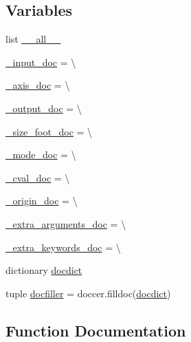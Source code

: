 \subsection*{Variables}
\begin{DoxyCompactItemize}
\item 
list \hyperlink{namespacescipy_1_1ndimage_1_1filters_ac79030aaeea1d53c8b972f784ac66d06}{\+\_\+\+\_\+all\+\_\+\+\_\+}
\item 
\hyperlink{namespacescipy_1_1ndimage_1_1filters_a08ef522f16742ebb067397136cab147e}{\+\_\+input\+\_\+doc} = \textbackslash{}
\item 
\hyperlink{namespacescipy_1_1ndimage_1_1filters_ae52acf6c02c107c138569883c504a41a}{\+\_\+axis\+\_\+doc} = \textbackslash{}
\item 
\hyperlink{namespacescipy_1_1ndimage_1_1filters_a69c29fe224c1e81495866bef44d9e62c}{\+\_\+output\+\_\+doc} = \textbackslash{}
\item 
\hyperlink{namespacescipy_1_1ndimage_1_1filters_adac799f87c552106379fd582c7191970}{\+\_\+size\+\_\+foot\+\_\+doc} = \textbackslash{}
\item 
\hyperlink{namespacescipy_1_1ndimage_1_1filters_a722135c1c890de3b40b1da0b938212a6}{\+\_\+mode\+\_\+doc} = \textbackslash{}
\item 
\hyperlink{namespacescipy_1_1ndimage_1_1filters_ac8ff6160df07471e0052d8b6415fe4d1}{\+\_\+cval\+\_\+doc} = \textbackslash{}
\item 
\hyperlink{namespacescipy_1_1ndimage_1_1filters_a8dba5fd5086b763fe538468c6235489f}{\+\_\+origin\+\_\+doc} = \textbackslash{}
\item 
\hyperlink{namespacescipy_1_1ndimage_1_1filters_ab4871ea2b9c43a04db7cdec46e38c919}{\+\_\+extra\+\_\+arguments\+\_\+doc} = \textbackslash{}
\item 
\hyperlink{namespacescipy_1_1ndimage_1_1filters_a894680df26ed62608b4205d3d7fd6f88}{\+\_\+extra\+\_\+keywords\+\_\+doc} = \textbackslash{}
\item 
dictionary \hyperlink{namespacescipy_1_1ndimage_1_1filters_a3ef4ac5181e80a02cfaad0bb6e786db3}{docdict}
\item 
tuple \hyperlink{namespacescipy_1_1ndimage_1_1filters_a5d480e01864ddd5886da30ab77494d2a}{docfiller} = doccer.\+filldoc(\hyperlink{namespacescipy_1_1ndimage_1_1filters_a3ef4ac5181e80a02cfaad0bb6e786db3}{docdict})
\end{DoxyCompactItemize}


\subsection{Function Documentation}
\hypertarget{namespacescipy_1_1ndimage_1_1filters_a5180359cf93d56193436f59978e36036}{}
